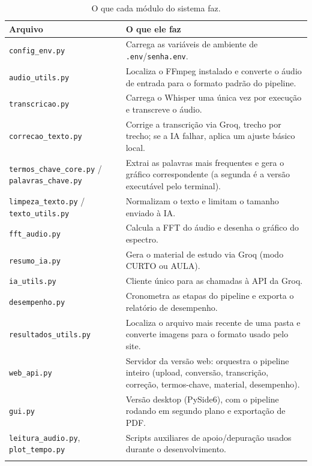 \documentclass[11pt,a4paper]{article}
\begin{document}
\begin{longtable}{@{}p{3.8cm}p{10.6cm}@{}}
\toprule
\textbf{Arquivo} & \textbf{O que ele faz} \\
\midrule
\endhead
\texttt{config\_env.py} & Carrega as variáveis de ambiente de \texttt{.env}/\texttt{senha.env}. \\
\texttt{audio\_utils.py} & Localiza o FFmpeg instalado e converte o áudio de entrada para o formato padrão do pipeline. \\
\texttt{transcricao.py} & Carrega o Whisper uma única vez por execução e transcreve o áudio. \\
\texttt{correcao\_texto.py} & Corrige a transcrição via Groq, trecho por trecho; se a IA falhar, aplica um ajuste básico local. \\
\texttt{termos\_chave\_core.py} / \texttt{palavras\_chave.py} & Extrai as palavras mais frequentes e gera o gráfico correspondente (a segunda é a versão executável pelo terminal). \\
\texttt{limpeza\_texto.py} / \texttt{texto\_utils.py} & Normalizam o texto e limitam o tamanho enviado à IA. \\
\texttt{fft\_audio.py} & Calcula a FFT do áudio e desenha o gráfico do espectro. \\
\texttt{resumo\_ia.py} & Gera o material de estudo via Groq (modo CURTO ou AULA). \\
\texttt{ia\_utils.py} & Cliente único para as chamadas à API da Groq. \\
\texttt{desempenho.py} & Cronometra as etapas do pipeline e exporta o relatório de desempenho. \\
\texttt{resultados\_utils.py} & Localiza o arquivo mais recente de uma pasta e converte imagens para o formato usado pelo site. \\
\texttt{web\_api.py} & Servidor da versão web: orquestra o pipeline inteiro (upload, conversão, transcrição, correção, termos-chave, material, desempenho). \\
\texttt{gui.py} & Versão desktop (PySide6), com o pipeline rodando em segundo plano e exportação de PDF. \\
\texttt{leitura\_audio.py}, \texttt{plot\_tempo.py} & Scripts auxiliares de apoio/depuração usados durante o desenvolvimento. \\
\bottomrule
\caption{O que cada módulo do sistema faz.}
\label{tab:modulos}
\end{longtable}

\end{document}
